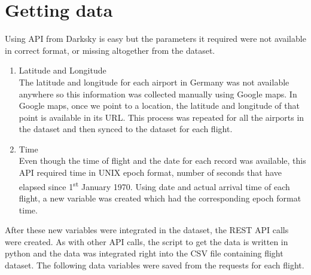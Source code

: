 \section{Getting data}
Using API from Darksky is easy but the parameters it required were not available in correct format, or missing altogether from the dataset. 
\begin{enumerate}
    \item Latitude and Longitude
    \\ The latitude and longitude for each airport in Germany was not available anywhere so this information was collected manually using Google maps. In Google maps, once we point to a location, the latitude and longitude of that point is available in its URL. This process was repeated for all the airports in the dataset and then synced to the dataset for each flight.
    \item Time
    \\Even though the time of flight and the date for each record was available, this API required time in UNIX epoch format, number of seconds that have elapsed since 1\textsuperscript{st} January 1970. Using date and actual arrival time of each flight, a new variable was created which had the corresponding epoch format time.
\end{enumerate}

After these new variables were integrated in the dataset, the REST API calls were created. As with other API calls, the script to get the data is written in python and the data was integrated right into the CSV file containing flight dataset. The following data variables were saved from the requests for each flight.


